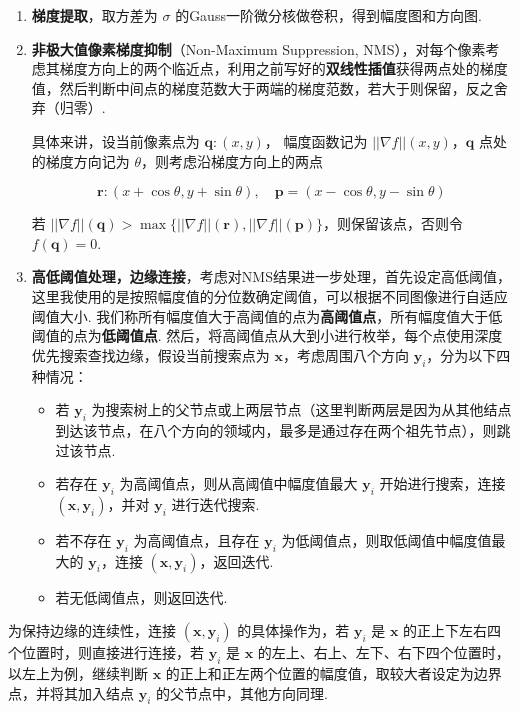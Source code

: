 \documentclass[12pt, a4paper, oneside]{ctexart}
\numberwithin{equation}{section}  %
\begin{document}
\begin{enumerate}
\def\labelenumi{\arabic{enumi}.}
\item
  \textbf{梯度提取}，取方差为 \(\sigma\)
  的Gauss一阶微分核做卷积，得到幅度图和方向图.
\item
  \textbf{非极大值像素梯度抑制}（Non-Maximum Suppression,
  NMS），对每个像素考虑其梯度方向上的两个临近点，利用之前写好的\textbf{双线性插值}获得两点处的梯度值，然后判断中间点的梯度范数大于两端的梯度范数，若大于则保留，反之舍弃（归零）.

  具体来讲，设当前像素点为 \(\boldsymbol{q}: (x, y)\)， 幅度函数记为
  \(||\nabla f||(x, y)\)，\(\boldsymbol{q}\) 点处的梯度方向记为
  \(\theta\)，则考虑沿梯度方向上的两点

  \[\boldsymbol{r}:(x+\cos \theta, y+\sin\theta),\quad
  \boldsymbol{p}=(x-\cos\theta, y-\sin\theta)\]

  若
  \(||\nabla f||(\boldsymbol{q}) > \max\{||\nabla f||(\boldsymbol{r}),||\nabla f||(\boldsymbol{p})\}\)，则保留该点，否则令
  \(f(\boldsymbol{q}) = 0\).
\item
  \textbf{高低阈值处理，边缘连接}，考虑对NMS结果进一步处理，首先设定高低阈值，这里我使用的是按照幅度值的分位数确定阈值，可以根据不同图像进行自适应阈值大小.
  我们称所有幅度值大于高阈值的点为\textbf{高阈值点}，所有幅度值大于低阈值的点为\textbf{低阈值点}.
  然后，将高阈值点从大到小进行枚举，每个点使用深度优先搜索查找边缘，假设当前搜索点为
  \(\boldsymbol{x}\)，考虑周围八个方向
  \(\boldsymbol{y}_i\)，分为以下四种情况：

  \begin{itemize}
  \item
    若 \(\boldsymbol{y}_i\)
    为搜索树上的父节点或上两层节点（这里判断两层是因为从其他结点到达该节点，在八个方向的领域内，最多是通过存在两个祖先节点），则跳过该节点.
  \item
    若存在 \(\boldsymbol{y}_i\) 为高阈值点，则从高阈值中幅度值最大
    \(\boldsymbol{y}_i\) 开始进行搜索，连接
    \((\boldsymbol{x}, \boldsymbol{y}_i)\)，并对 \(\boldsymbol{y}_i\)
    进行迭代搜索.
  \item
    若不存在 \(\boldsymbol{y}_i\) 为高阈值点，且存在
    \(\boldsymbol{y}_i\) 为低阈值点，则取低阈值中幅度值最大的
    \(\boldsymbol{y}_i\)，连接
    \((\boldsymbol{x}, \boldsymbol{y}_i)\)，返回迭代.
  \item
    若无低阈值点，则返回迭代.
  \end{itemize}
\end{enumerate}

为保持边缘的连续性，连接 \((\boldsymbol{x}, \boldsymbol{y}_i)\)
的具体操作为，若 \(\boldsymbol{y}_i\) 是 \(\boldsymbol{x}\)
的正上下左右四个位置时，则直接进行连接，若 \(\boldsymbol{y}_i\) 是
\(\boldsymbol{x}\)
的左上、右上、左下、右下四个位置时，以左上为例，继续判断
\(\boldsymbol{x}\)
的正上和正左两个位置的幅度值，取较大者设定为边界点，并将其加入结点
\(\boldsymbol{y}_i\) 的父节点中，其他方向同理.
\end{document}
